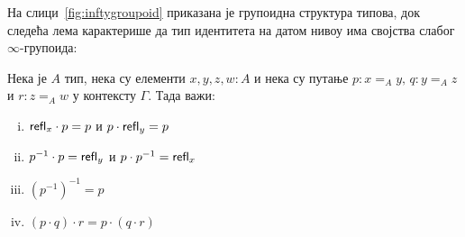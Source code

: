 \documentclass[12pt,oneside]{memoir}
\begin{document}
На слици~\ref{fig:inftygroupoid} приказана је групоидна структура типова, док следећа лема карактерише да тип идентитета на датом нивоу има својства слабог $\infty$-групоида:

\begin{lemma}
    Нека је $A$ тип, нека су елементи $x, y, z, w : A$ и нека су путање $p : x =_A y,\, q : y =_A z$ и $r : z =_A w$ у контексту $\Gamma$. Тада важи:
    \begin{enumerate}[(i)]
        \item $\mathsf{refl}_{x} \cdot p = p$ и $p \cdot \mathsf{refl}_{y} = p$
        \item $p^{-1} \cdot p = \mathsf{refl}_{y}$ и $p \cdot p^{-1} = \mathsf{refl}_{x}$
        \item $(p^{-1})^{-1} = p$
        \item $(p \cdot q) \cdot r = p \cdot (q \cdot r)$
    \end{enumerate}
\end{lemma}
\end{document}
